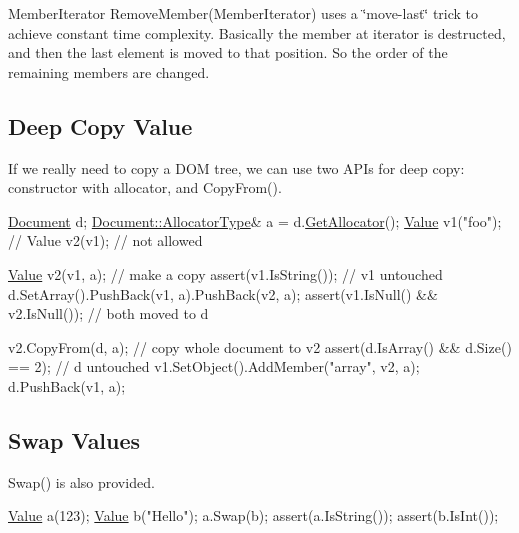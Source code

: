 {\ttfamily Member\+Iterator Remove\+Member(\+Member\+Iterator)} uses a \char`\"{}move-\/last\char`\"{} trick to achieve constant time complexity. Basically the member at iterator is destructed, and then the last element is moved to that position. So the order of the remaining members are changed.\hypertarget{md_Commun_Externe_RapidJSON_doc_tutorial.zh-cn_DeepCopyValue}{}\subsection{Deep Copy Value}\label{md_Commun_Externe_RapidJSON_doc_tutorial.zh-cn_DeepCopyValue}
If we really need to copy a D\+OM tree, we can use two A\+P\+Is for deep copy\+: constructor with allocator, and {\ttfamily Copy\+From()}.


\begin{DoxyCode}
\hyperlink{class_generic_document}{Document} d;
\hyperlink{class_generic_document_a35155b912da66ced38d22e2551364c57}{Document::AllocatorType}& a = d.\hyperlink{class_generic_document_aa4609d6b19f86aec1a6b96edf2c27686}{GetAllocator}();
\hyperlink{class_generic_value}{Value} v1(\textcolor{stringliteral}{"foo"});
\textcolor{comment}{// Value v2(v1); // not allowed}

\hyperlink{class_generic_value}{Value} v2(v1, a);                      \textcolor{comment}{// make a copy}
assert(v1.IsString());                \textcolor{comment}{// v1 untouched}
d.SetArray().PushBack(v1, a).PushBack(v2, a);
assert(v1.IsNull() && v2.IsNull());   \textcolor{comment}{// both moved to d}

v2.CopyFrom(d, a);                    \textcolor{comment}{// copy whole document to v2}
assert(d.IsArray() && d.Size() == 2); \textcolor{comment}{// d untouched}
v1.SetObject().AddMember(\textcolor{stringliteral}{"array"}, v2, a);
d.PushBack(v1, a);
\end{DoxyCode}
\hypertarget{md_Commun_Externe_RapidJSON_doc_tutorial.zh-cn_SwapValues}{}\subsection{Swap Values}\label{md_Commun_Externe_RapidJSON_doc_tutorial.zh-cn_SwapValues}
{\ttfamily Swap()} is also provided.


\begin{DoxyCode}
\hyperlink{class_generic_value}{Value} a(123);
\hyperlink{class_generic_value}{Value} b(\textcolor{stringliteral}{"Hello"});
a.Swap(b);
assert(a.IsString());
assert(b.IsInt());
\end{DoxyCode}


